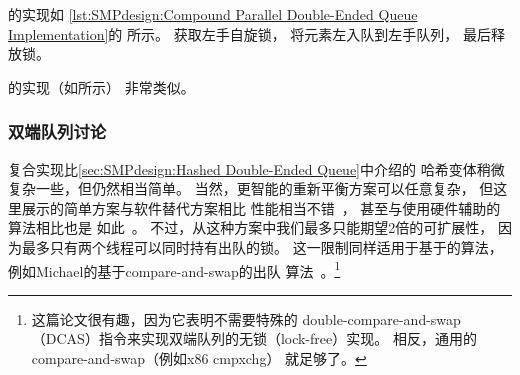 \begin{fcvref}
的实现如
\cref{lst:SMPdesign:Compound Parallel Double-Ended Queue Implementation}的
所示。
获取左手自旋锁，
将元素左入队到左手队列，
最后释放锁。
\end{fcvref}
\begin{fcvref}
的实现（如所示）
非常类似。
\end{fcvref}

\QuickQuizEnd

\subsubsection{双端队列讨论}
\label{sec:SMPdesign:Double-Ended Queue Discussion}

复合实现比\cref{sec:SMPdesign:Hashed Double-Ended Queue}中介绍的
哈希变体稍微复杂一些，但仍然相当简单。
当然，更智能的重新平衡方案可以任意复杂，
但这里展示的简单方案与软件替代方案相比
性能相当不错~\cite{LukeDalessandro:2011:ASPLOS:HybridNOrecSTM:deque}，
甚至与使用硬件辅助的算法相比也是
如此~\cite{DavidDice:2010:SCA:HTM:deque}。
不过，从这种方案中我们最多只能期望2倍的可扩展性，
因为最多只有两个线程可以同时持有出队的锁。
这一限制同样适用于基于的算法，
例如Michael的基于compare-and-swap的出队
算法~\cite{DBLP:conf/europar/Michael03}。\footnote{
	这篇论文很有趣，因为它表明不需要特殊的
	double-compare-and-swap（DCAS）指令来实现双端队列的无锁（lock-free）实现。
	相反，通用的compare-and-swap（例如x86 cmpxchg）
	就足够了。}

